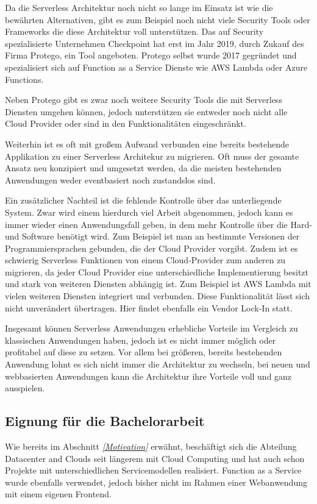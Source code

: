 Da die Serverless Architektur noch nicht so lange im Einsatz ist wie die bewährten Alternativen, gibt es zum Beispiel noch nicht viele Security Tools oder Frameworks die diese Architektur voll unterstützen.
Das auf Security spezialisierte Unternehmen Checkpoint hat erst im Jahr 2019, durch Zukauf des Firma Protego, ein Tool angeboten.
Protego selbst wurde 2017 gegründet und spezialisiert sich auf Function as a Service Dienste wie AWS Lambda oder Azure Functions. \cite{Checkpoint}

Neben Protego gibt es zwar noch weitere Security Tools die mit Serverless Diensten umgehen können, jedoch unterstützen sie entweder noch nicht alle Cloud Provider oder sind in den Funktionalitäten eingeschränkt. \cite{Security}

Weiterhin ist es oft mit großem Aufwand verbunden eine bereits bestehende Applikation zu einer Serverless Architekur zu migrieren.
Oft muss der gesamte Ansatz neu konzipiert und umgesetzt werden, da die meisten bestehenden Anwendungen weder eventbasiert noch zustandslos sind.

Ein zusätzlicher Nachteil ist die fehlende Kontrolle über das unterliegende System.
Zwar wird einem hierdurch viel Arbeit abgenommen, jedoch kann es immer wieder einen Anwendungsfall geben, in dem mehr Kontrolle über die Hard- und Software benötigt wird.
Zum Beispiel ist man an bestimmte Versionen der Programmiersprachen gebunden, die der Cloud Provider vorgibt.
Zudem ist es schwierig Serverless Funktionen von einem Cloud-Provider zum anderen zu migrieren, da jeder Cloud Provider eine unterschiedliche Implementierung besitzt und stark von weiteren Diensten abhängig ist.
Zum Beispiel ist AWS Lambda mit vielen weiteren Diensten integriert und verbunden.
Diese Funktionalität lässt sich nicht unverändert übertragen.
Hier findet ebenfalls ein Vendor Lock-In statt.


Insgesamt können Serverless Anwendungen erhebliche Vorteile im Vergleich zu klassischen Anwendungen haben, jedoch ist es nicht immer möglich oder profitabel auf diese zu setzen.
Vor allem bei größeren, bereits bestehenden Anwendung lohnt es sich nicht immer die Architektur zu wechseln, bei neuen und webbasierten Anwendungen kann die Architektur ihre Vorteile voll und ganz ausspielen.

\subsection{Eignung für die Bachelorarbeit}
Wie bereits im Abschnitt \textit{\ref{Motivation} } erwähnt, beschäftigt sich die Abteilung Datacenter and Clouds seit längerem mit Cloud Computing und hat auch schon Projekte mit unterschiedlichen Servicemodellen realisiert.
Function as a Service wurde ebenfalls verwendet, jedoch bisher nicht im Rahmen einer Webanwendung mit einem eigenen Frontend.

